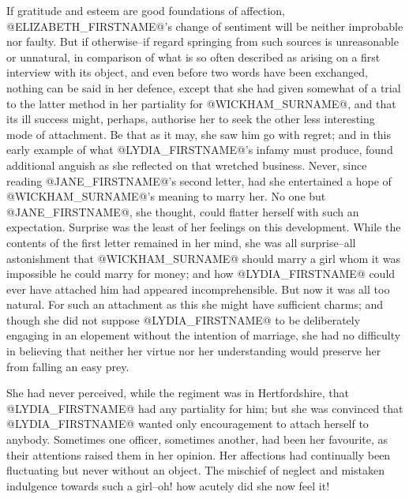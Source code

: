 If gratitude and esteem are good foundations of affection, @ELIZABETH_FIRSTNAME@'s
change of sentiment will be neither improbable nor faulty. But if
otherwise--if regard springing from such sources is unreasonable or
unnatural, in comparison of what is so often described as arising on
a first interview with its object, and even before two words have been
exchanged, nothing can be said in her defence, except that she had given
somewhat of a trial to the latter method in her partiality for @WICKHAM_SURNAME@,
and that its ill success might, perhaps, authorise her to seek the other
less interesting mode of attachment. Be that as it may, she saw him
go with regret; and in this early example of what @LYDIA_FIRSTNAME@'s infamy must
produce, found additional anguish as she reflected on that wretched
business. Never, since reading @JANE_FIRSTNAME@'s second letter, had she entertained
a hope of @WICKHAM_SURNAME@'s meaning to marry her. No one but @JANE_FIRSTNAME@, she thought,
could flatter herself with such an expectation. Surprise was the least
of her feelings on this development. While the contents of the first
letter remained in her mind, she was all surprise--all astonishment that
@WICKHAM_SURNAME@ should marry a girl whom it was impossible he could marry
for money; and how @LYDIA_FIRSTNAME@ could ever have attached him had appeared
incomprehensible. But now it was all too natural. For such an attachment
as this she might have sufficient charms; and though she did not suppose
@LYDIA_FIRSTNAME@ to be deliberately engaging in an elopement without the intention
of marriage, she had no difficulty in believing that neither her virtue
nor her understanding would preserve her from falling an easy prey.

She had never perceived, while the regiment was in Hertfordshire, that
@LYDIA_FIRSTNAME@ had any partiality for him; but she was convinced that @LYDIA_FIRSTNAME@
wanted only encouragement to attach herself to anybody. Sometimes one
officer, sometimes another, had been her favourite, as their attentions
raised them in her opinion. Her affections had continually been
fluctuating but never without an object. The mischief of neglect and
mistaken indulgence towards such a girl--oh! how acutely did she now
feel it!

